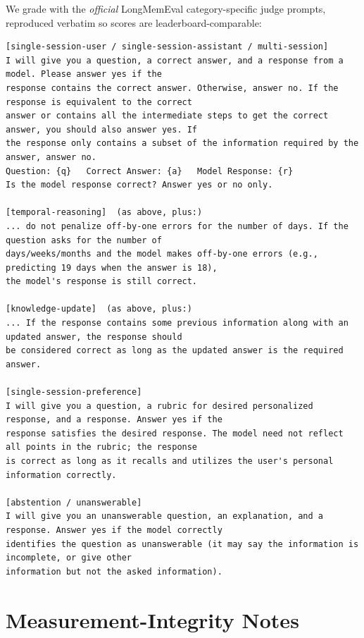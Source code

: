 \documentclass{article}
\begin{document}
\noindent We grade with the \emph{official} LongMemEval category-specific judge prompts, reproduced
verbatim so scores are leaderboard-comparable:
\begin{lstlisting}[style=prompt]
[single-session-user / single-session-assistant / multi-session]
I will give you a question, a correct answer, and a response from a model. Please answer yes if the
response contains the correct answer. Otherwise, answer no. If the response is equivalent to the correct
answer or contains all the intermediate steps to get the correct answer, you should also answer yes. If
the response only contains a subset of the information required by the answer, answer no.
Question: {q}   Correct Answer: {a}   Model Response: {r}
Is the model response correct? Answer yes or no only.

[temporal-reasoning]  (as above, plus:)
... do not penalize off-by-one errors for the number of days. If the question asks for the number of
days/weeks/months and the model makes off-by-one errors (e.g., predicting 19 days when the answer is 18),
the model's response is still correct.

[knowledge-update]  (as above, plus:)
... If the response contains some previous information along with an updated answer, the response should
be considered correct as long as the updated answer is the required answer.

[single-session-preference]
I will give you a question, a rubric for desired personalized response, and a response. Answer yes if the
response satisfies the desired response. The model need not reflect all points in the rubric; the response
is correct as long as it recalls and utilizes the user's personal information correctly.

[abstention / unanswerable]
I will give you an unanswerable question, an explanation, and a response. Answer yes if the model correctly
identifies the question as unanswerable (it may say the information is incomplete, or give other
information but not the asked information).
\end{lstlisting}

\section{Measurement-Integrity Notes}
\label{app:integrity}
\end{document}
